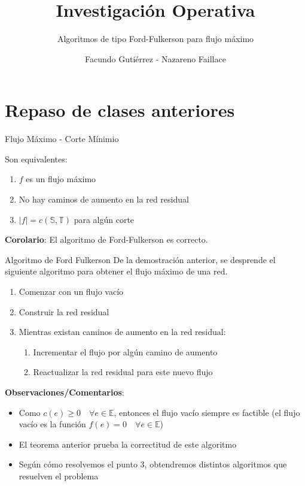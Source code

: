 \documentclass[8pt,xcolor={dvipsnames}]{beamer}
\title{Investigación Operativa}
\subtitle{Algoritmos de tipo Ford-Fulkerson para flujo m\'aximo}
\date{}
\author{Facundo Gutiérrez - Nazareno Faillace}
\institute{Departamento de Matemática, FCEN, UBA}
\begin{document}
\maketitle

\section{Repaso de clases anteriores}

\begin{frame}{Flujo M\'aximo - Corte Mínimio}
    \begin{tcolorbox}[title=Teorema]
        Son equivalentes:
	\begin{enumerate}
		\item $f$ es un flujo m\'aximo
		\item No hay caminos de aumento en la red residual
		\item $|f| = c(\mathbb{S},\mathbb{T})$ para alg\'un corte
	\end{enumerate}  
    \end{tcolorbox}
	 \textbf{Corolario}: El algoritmo de Ford-Fulkerson es correcto.
\end{frame}

\begin{frame}{Algoritmo de Ford Fulkerson}
	De la demostraci\'on anterior, se desprende el siguiente algoritmo para obtener el flujo m\'aximo de una red.
	\begin{enumerate}
		\item Comenzar con un flujo vac\'io
		\item Construir la red residual
		\item Mientras existan caminos de aumento en la red residual:
		\begin{enumerate}
			\item Incrementar el flujo por alg\'un camino de aumento
			\item Reactualizar la red residual para este nuevo flujo 
		\end{enumerate}
	\end{enumerate} 
	\pause
	\textbf{Observaciones/Comentarios}:
	\begin{itemize}
		\item Como $c(e) \geq 0 \quad \forall e \in \mathbb{E}$, entonces el flujo vac\'io siempre es factible (el flujo vac\'io es la funci\'on $f(e) = 0 \quad \forall e \in \mathbb{E}$)
		\item El teorema anterior prueba la correctitud de este algoritmo
		\item Seg\'un c\'omo resolvemos el punto 3, obtendremos distintos algoritmos que resuelven el problema
	\end{itemize}
	
\end{frame}
\end{document}

